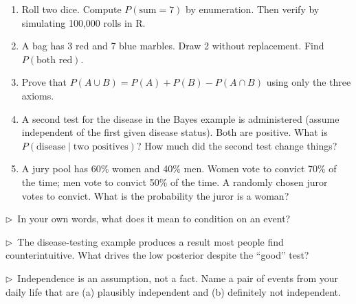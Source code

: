 \begin{enumerate}
  \item Roll two dice. Compute $P(\text{sum} = 7)$ by enumeration. Then verify by simulating 100{,}000 rolls in R.

  \item A bag has 3 red and 7 blue marbles. Draw 2 without replacement. Find $P(\text{both red})$.

  \item Prove that $P(A \cup B) = P(A) + P(B) - P(A \cap B)$ using only the three axioms.

  \item A second test for the disease in the Bayes example is administered (assume independent of the first given disease status). Both are positive. What is $P(\text{disease} \mid \text{two positives})$? How much did the second test change things?

  \item A jury pool has 60\% women and 40\% men. Women vote to convict 70\% of the time; men vote to convict 50\% of the time. A randomly chosen juror votes to convict. What is the probability the juror is a woman?
\end{enumerate}

\begin{reflect}
$\triangleright$~In your own words, what does it mean to condition on an event?

\smallskip
$\triangleright$~The disease-testing example produces a result most people find counterintuitive. What drives the low posterior despite the ``good'' test?

\smallskip
$\triangleright$~Independence is an assumption, not a fact. Name a pair of events from your daily life that are (a) plausibly independent and (b) definitely not independent.
\end{reflect}

